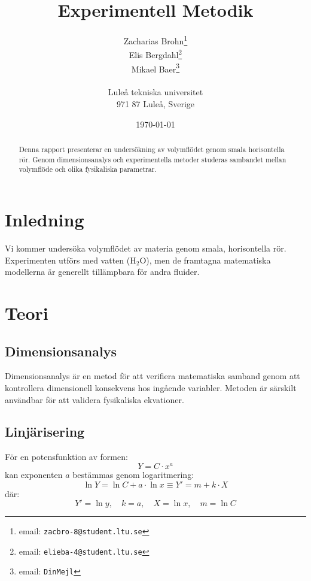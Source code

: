\documentclass[a4paper,12pt]{article}
\begin{document}
%
\title{Experimentell Metodik}
%
\author{Zacharias Brohn\thanks{email: \texttt{zacbro-8@student.ltu.se}}\\  
        Elis Bergdahl\thanks{email: \texttt{elieba-4@student.ltu.se}} \\
        Mikael Baer\thanks{email: \texttt{DinMejl}} \\
        \\
        Luleå tekniska universitet \\ 
        971 87 Luleå, Sverige}
%
\date{\today}
%
\maketitle
%
\begin{abstract}
    Denna rapport presenterar en undersökning av volymflödet genom smala horisontella rör. 
    Genom dimensionsanalys och experimentella metoder studeras sambandet mellan volymflöde 
    och olika fysikaliska parametrar.
\end{abstract}
%
\section{Inledning}
Vi kommer undersöka volymflödet av materia genom smala, horisontella rör. 
Experimenten utförs med vatten ($\mathrm{H_2O}$), men de framtagna matematiska 
modellerna är generellt tillämpbara för andra fluider.
%
\section{Teori}
%
\subsection{Dimensionsanalys}
Dimensionsanalys är en metod för att verifiera matematiska samband genom att 
kontrollera dimensionell konsekvens hos ingående variabler. Metoden är särskilt 
användbar för att validera fysikaliska ekvationer.

\subsection{Linjärisering}
För en potensfunktion av formen:
\begin{equation}
    Y = C \cdot x^a
\end{equation}
kan exponenten $a$ bestämmas genom logaritmering:
\begin{equation}
    \ln Y = \ln C + a \cdot \ln x \equiv Y' = m + k \cdot X
\end{equation}
där:
\begin{equation}
    Y' = \ln y,\quad k = a,\quad X = \ln x,\quad m = \ln C
\end{equation}
%
\end{document}
